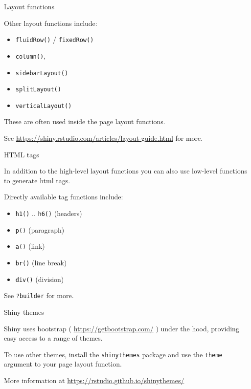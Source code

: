 \documentclass[
  12pt,
  ignorenonframetext,
]{beamer}
\providecommand{\tightlist}{%
  \setlength{\itemsep}{0pt}\setlength{\parskip}{0pt}}
\begin{document}
\begin{frame}[fragile]{Layout functions}
\protect\hypertarget{layout-functions}{}

Other layout functions include:

\begin{itemize}
\tightlist
\item
  \texttt{fluidRow()} / \texttt{fixedRow()}
\item
  \texttt{column()},
\item
  \texttt{sidebarLayout()}
\item
  \texttt{splitLayout()}
\item
  \texttt{verticalLayout()}
\end{itemize}

These are often used inside the page layout functions.

See \url{https://shiny.rstudio.com/articles/layout-guide.html} for more.

\end{frame}

\begin{frame}[fragile]{HTML tags}
\protect\hypertarget{html-tags}{}

In addition to the high-level layout functions you can also use
low-level functions to generate html tags.

Directly available tag functions include:

\begin{itemize}
\tightlist
\item
  \texttt{h1()} .. \texttt{h6()} (headers)
\item
  \texttt{p()} (paragraph)
\item
  \texttt{a()} (link)
\item
  \texttt{br()} (line break)
\item
  \texttt{div()} (division)
\end{itemize}

See \texttt{?builder} for more.

\end{frame}

\begin{frame}[fragile]{Shiny themes}
\protect\hypertarget{shiny-themes}{}

Shiny uses bootstrap ( \url{https://getbootstrap.com/} ) under the hood,
providing easy access to a range of themes.

To use other themes, install the \texttt{shinythemes} package and use
the \texttt{theme} argument to your page layout function.

More information at \url{https://rstudio.github.io/shinythemes/}

\end{frame}
\end{document}
